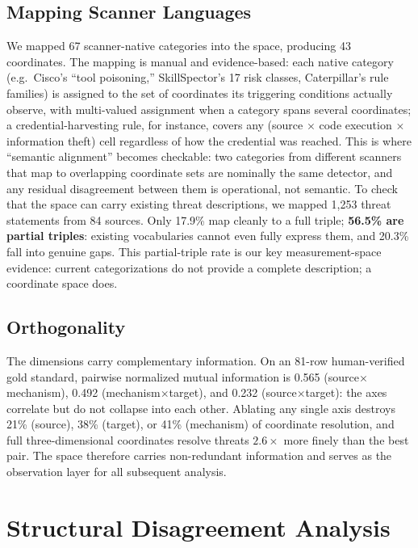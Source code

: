\documentclass[sigconf,nonacm]{acmart}
\begin{document}
\subsection{Mapping Scanner Languages}
We mapped 67 scanner-native categories into the space, producing 43 coordinates. The mapping is manual and evidence-based: each native category (e.g.\ Cisco's ``tool poisoning,'' SkillSpector's 17 risk classes, Caterpillar's rule families) is assigned to the set of coordinates its triggering conditions actually observe, with multi-valued assignment when a category spans several coordinates; a credential-harvesting rule, for instance, covers any (source $\times$ code execution $\times$ information theft) cell regardless of how the credential was reached. This is where ``semantic alignment'' becomes checkable: two categories from different scanners that map to overlapping coordinate sets are nominally the same detector, and any residual disagreement between them is operational, not semantic. To check that the space can carry existing threat descriptions, we mapped 1{,}253 threat statements from 84 sources. Only 17.9\% map cleanly to a full triple; \textbf{56.5\% are partial triples}: existing vocabularies cannot even fully express them, and 20.3\% fall into genuine gaps. This partial-triple rate is our key measurement-space evidence: current categorizations do not provide a complete description; a coordinate space does.

\subsection{Orthogonality}
The dimensions carry complementary information. On an 81-row human-verified gold standard, pairwise normalized mutual information is 0.565 (source$\times$mechanism), 0.492 (mechanism$\times$target), and 0.232 (source$\times$target): the axes correlate but do not collapse into each other. Ablating any single axis destroys 21\% (source), 38\% (target), or 41\% (mechanism) of coordinate resolution, and full three-dimensional coordinates resolve threats $2.6\times$ more finely than the best pair. The space therefore carries non-redundant information and serves as the observation layer for all subsequent analysis.

\section{Structural Disagreement Analysis}
\label{sec:explain}
\end{document}
